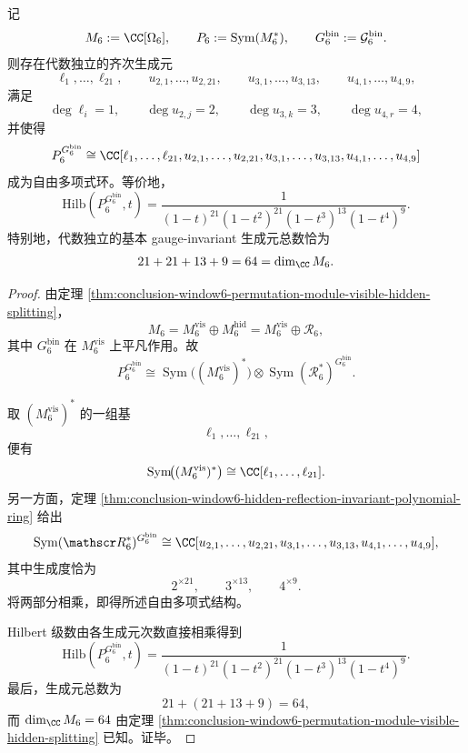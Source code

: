 \begin{theorem}\label{thm:conclusion-window6-full-gauge-invariant-polynomial-ring}
记
\[
M_6:=\CC[\Omega_6],
\qquad
P_6:=\operatorname{Sym}(M_6^\ast),
\qquad
G_6^{\mathrm{bin}}:=\mathcal G_6^{\mathrm{bin}}.
\]
则存在代数独立的齐次生成元
\[
\ell_1,\dots,\ell_{21},
\qquad
u_{2,1},\dots,u_{2,21},
\qquad
u_{3,1},\dots,u_{3,13},
\qquad
u_{4,1},\dots,u_{4,9},
\]
满足
\[
\deg \ell_i=1,\qquad
\deg u_{2,j}=2,\qquad
\deg u_{3,k}=3,\qquad
\deg u_{4,r}=4,
\]
并使得
\[
P_6^{G_6^{\mathrm{bin}}}
\cong
\CC[\ell_1,\dots,\ell_{21},u_{2,1},\dots,u_{2,21},u_{3,1},\dots,u_{3,13},u_{4,1},\dots,u_{4,9}]
\]
成为自由多项式环。等价地，
\[
\mathrm{Hilb}\!\left(P_6^{G_6^{\mathrm{bin}}},t\right)
=
\frac{1}{(1-t)^{21}(1-t^2)^{21}(1-t^3)^{13}(1-t^4)^9}.
\]
特别地，代数独立的基本 gauge-invariant 生成元总数恰为
\[
21+21+13+9=64=\dim_{\CC}M_6.
\]
\end{theorem}
\begin{proof}
由定理 \ref{thm:conclusion-window6-permutation-module-visible-hidden-splitting}，
\[
M_6=M_6^{\mathrm{vis}}\oplus M_6^{\mathrm{hid}}
=
M_6^{\mathrm{vis}}\oplus \mathscr R_6,
\]
其中 \(G_6^{\mathrm{bin}}\) 在 \(M_6^{\mathrm{vis}}\) 上平凡作用。故
\[
P_6^{G_6^{\mathrm{bin}}}
\cong
\operatorname{Sym}\!\bigl((M_6^{\mathrm{vis}})^\ast\bigr)\otimes
\operatorname{Sym}(\mathscr R_6^\ast)^{G_6^{\mathrm{bin}}}.
\]

取 \((M_6^{\mathrm{vis}})^\ast\) 的一组基
\[
\ell_1,\dots,\ell_{21},
\]
便有
\[
\operatorname{Sym}\!\bigl((M_6^{\mathrm{vis}})^\ast\bigr)
\cong
\CC[\ell_1,\dots,\ell_{21}].
\]
另一方面，定理 \ref{thm:conclusion-window6-hidden-reflection-invariant-polynomial-ring} 给出
\[
\operatorname{Sym}(\mathscr R_6^\ast)^{G_6^{\mathrm{bin}}}
\cong
\CC[u_{2,1},\dots,u_{2,21},u_{3,1},\dots,u_{3,13},u_{4,1},\dots,u_{4,9}],
\]
其中生成度恰为
\[
2^{\times 21},\qquad 3^{\times 13},\qquad 4^{\times 9}.
\]
将两部分相乘，即得所述自由多项式结构。

Hilbert 级数由各生成元次数直接相乘得到
\[
\mathrm{Hilb}\!\left(P_6^{G_6^{\mathrm{bin}}},t\right)
=
\frac{1}{(1-t)^{21}(1-t^2)^{21}(1-t^3)^{13}(1-t^4)^9}.
\]
最后，生成元总数为
\[
21+(21+13+9)=64,
\]
而 \(\dim_{\CC}M_6=64\) 由定理 \ref{thm:conclusion-window6-permutation-module-visible-hidden-splitting} 已知。证毕。
\end{proof}

